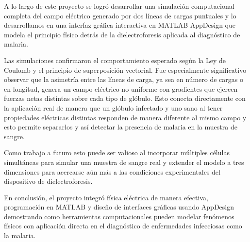 \tab A lo largo de este proyecto se logró desarrollar una simulación computacional completa del campo eléctrico generado por dos líneas de cargas puntuales y lo desarrollamos en una interfaz gráfica interactiva en MATLAB AppDesign que modela el principio físico detrás de la dielectroforesis aplicada al diagnóstico de malaria.

\tab Las simulaciones confirmaron el comportamiento esperado según la Ley de Coulomb y el principio de superposición vectorial. Fue especialmente significativo observar que la asimetría entre las líneas de carga, ya sea en número de cargas o en longitud, genera un campo eléctrico no uniforme con gradientes que ejercen fuerzas netas distintas sobre cada tipo de glóbulo. Esto conecta directamente con la aplicación real de manera que un glóbulo infectado y uno sano al tener propiedades eléctricas distintas responden de manera diferente al mismo campo y esto permite separarlos y así detectar la presencia de malaria en la muestra de sangre.

\tab Como trabajo a futuro esto puede ser valioso al incorporar múltiples células simultáneas para simular una muestra de sangre real y extender el modelo a tres dimensiones para acercarse aún más a las condiciones experimentales del dispositivo de dielectroforesis. 

\tab En conclusión, el proyecto integró física eléctrica de manera efectiva, programación en MATLAB y diseño de interfaces gráficas usando AppDesign demostrando como herramientas computacionales pueden modelar fenómenos físicos con aplicación directa en el diagnóstico de enfermedades infecciosas como la malaria.
